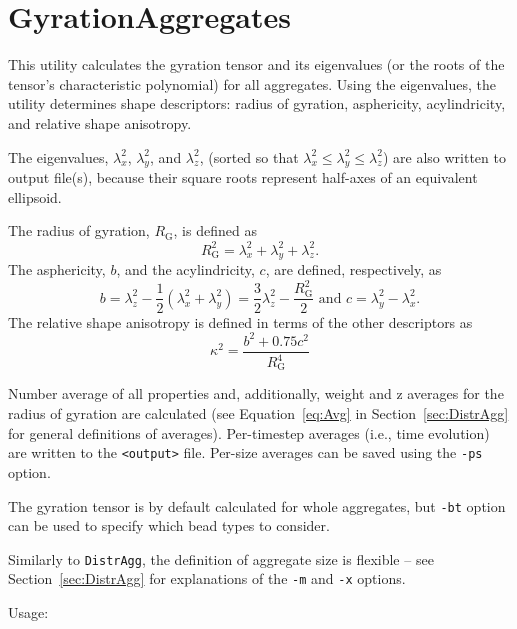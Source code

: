\section{GyrationAggregates} \label{sec:GyrationAggregates}

This utility calculates the gyration tensor and its eigenvalues (or the
roots of the tensor's characteristic polynomial) for all aggregates. Using
the eigenvalues, the utility determines shape descriptors:
radius of gyration, asphericity, acylindricity, and relative shape
anisotropy.

The eigenvalues, $\lambda_x^2$, $\lambda_y^2$, and $\lambda_z^2$, (sorted
so that $\lambda_x^2\leq\lambda_y^2\leq\lambda_z^2$) are also written to
output file(s), because their square roots represent half-axes of an
equivalent ellipsoid.

The radius of gyration, $R_{\mathrm{G}}$, is defined as
\begin{equation} \label{eq:R_G}
  R_{\mathrm{G}}^2 = \lambda_x^2 + \lambda_y^2 + \lambda_z^2.
\end{equation}
The asphericity, $b$, and the acylindricity, $c$, are defined,
respectively, as
\begin{equation} \label{eq:b}
  b= \lambda_z^2 - \frac{1}{2}(\lambda_x^2 + \lambda_y^2) =
    \frac{3}{2}\lambda_z^2 - \frac{R_{\mathrm{G}}^2}{2}
  \mbox{ \ \ and \ \ }
  c = \lambda_y^2 - \lambda_x^2.
\end{equation}
The relative shape anisotropy is defined in terms of the other descriptors
as
\begin{equation} \label{eq:anis}
  \kappa^2 = \frac{b^2 + 0.75 c^2}{R_{\mathrm{G}}^4}
\end{equation}

Number average of all properties and, additionally, weight and z averages
for the radius of gyration are calculated (see Equation~\eqref{eq:Avg} in
Section~\ref{sec:DistrAgg} for general definitions of averages).
Per-timestep averages (i.e., time evolution) are written to the
\texttt{<output>} file. Per-size averages can be saved using the
\texttt{-ps} option.

The gyration tensor is by default calculated for whole aggregates, but
\texttt{-bt} option can be used to specify which bead types to consider.

Similarly to \texttt{DistrAgg}, the definition of aggregate size is
flexible -- see Section~\ref{sec:DistrAgg} for explanations of the
\texttt{-m} and \texttt{-x} options.

Usage:

